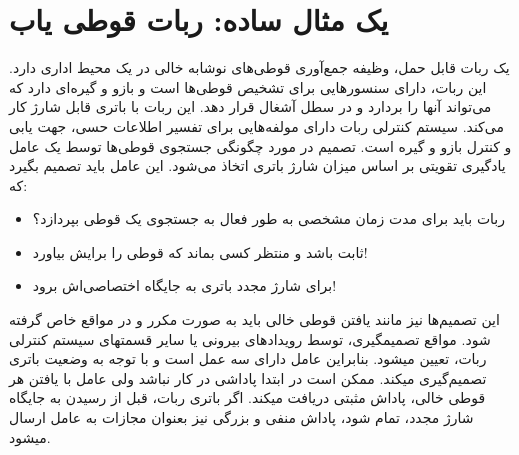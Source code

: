 \section{یک مثال ساده: ربات قوطی یاب \cite{suttonbook}}
یک ربات قابل حمل، وظیفه جمع‌آوری قوطی‌های نوشابه خالی در 
یک محیط اداری دارد. این ربات، دارای سنسورهایی برای تشخیص قوطی‌ها است و بازو و گیره‌ای دارد که می‌تواند آن\nf ها را بردارد و در سطل آشغال قرار دهد. این ربات  با باتری قابل شارژ کار می‌کند. سیستم کنترلی ربات
دارای مولفه‌هایی برای تفسیر اطلاعات حسی، جهت یابی و کنترل بازو و گیره است. تصمیم در مورد چگونگی جستجوی قوطی‌ها توسط یک عامل یادگیری تقویتی بر اساس میزان شارژ باتری اتخاذ می‌شود. این عامل باید تصمیم بگیرد که: 
\begin{itemize}
	\item  ربات باید برای مدت زمان مشخصی به طور فعال به جستجوی  یک قوطی بپردازد؟
	\item ثابت باشد و منتظر کسی بماند که قوطی را برایش بیاورد!
	\item  برای شارژ مجدد باتری به جایگاه اختصاصی‌اش  برود!
\end{itemize}
این تصمیم‌ها نیز مانند یافتن قوطی خالی باید به صورت مکرر و در مواقع خاص گرفته شود. مواقع تصمیم\nf گیری، توسط رویدادهای بیرونی یا سایر قسمت\nf های سیستم کنترلی ربات، تعیین می\nf شود. بنابراین عامل
دارای سه عمل است و با توجه به وضعیت باتری تصمیم‌گیری می\nf کند. ممکن است در ابتدا پاداشی در کار نباشد ولی عامل با یافتن هر قوطی خالی،  پاداش مثبتی دریافت می\nf کند. اگر باتری ربات، قبل از رسیدن به جایگاه شارژ مجدد، تمام شود، پاداش منفی و بزرگی نیز بعنوان مجازات به عامل ارسال می\nf شود.


